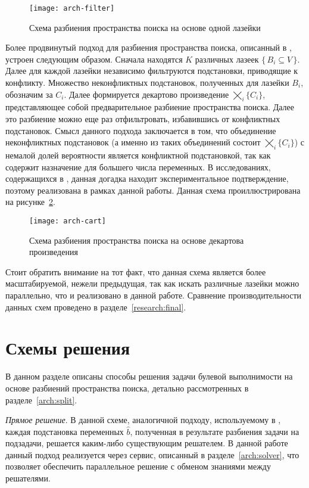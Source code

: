 \begin{figure}[H]
    \caption{Схема разбиения пространства поиска на основе одной лазейки}
    \centering
    \texttt{[image: arch-filter]}
    \label{arch:split:filter}
\end{figure}

Более продвинутый подход для разбиения пространства поиска, описанный в , устроен следующим
образом. Сначала находятся $K$ различных лазеек $\{\,B_i \subseteq V\,\}$. Далее для каждой лазейки 
независимо фильтруются подстановки, приводящие к конфликту. Множество неконфликтных подстановок,
полученных для лазейки $B_i$, обозначим за $C_i$. Далее формируется декартово произведение 
$\bigtimes_i\{C_i\}$, представляющее собой предварительное разбиение пространства поиска. Далее это
разбиение можно еще раз отфильтровать, избавившись от конфликтных подстановок.
Смысл данного подхода заключается в том, что объединение неконфликтных подстановок (а именно из
таких объединений состоит $\bigtimes_i\{C_i\}$) с немалой долей вероятности является конфликтной
подстановкой, так как содержит назначение для большего числа переменных. В исследованиях,
содержащихся в , данная догадка находит экспериментальное подтверждение, поэтому реализована
в рамках данной работы. Данная схема проиллюстрирована на рисунке~\ref{arch:split:cart}.

\begin{figure}[H]
    \caption{Схема разбиения пространства поиска на основе декартова произведения}
    \centering
    \texttt{[image: arch-cart]}
    \label{arch:split:cart}
\end{figure}

Стоит обратить внимание на тот факт, что данная схема является более масштабируемой, нежели предыдущая,
так как искать различные лазейки можно параллельно, что и реализовано в данной работе. Сравнение
производительности данных схем проведено в разделе~\ref{research:final}.

\section{Схемы решения}\label{arch:solve}

В данном разделе описаны способы решения задачи булевой выполнимости на основе разбиений пространства
поиска, детально рассмотренных в разделе~\ref{arch:split}.

\textit{Прямое решение}. В данной схеме, аналогичной подходу, используемому в , каждая
подстановка переменных $\hat{b}$, полученная в результате разбиения задачи на подзадачи, решается
каким-либо существующим решателем. В данной работе данный подход реализуется через сервис, описанный
в разделе~\ref{arch:solver}, что позволяет обеспечить параллельное решение с обменом знаниями между
решателями.

